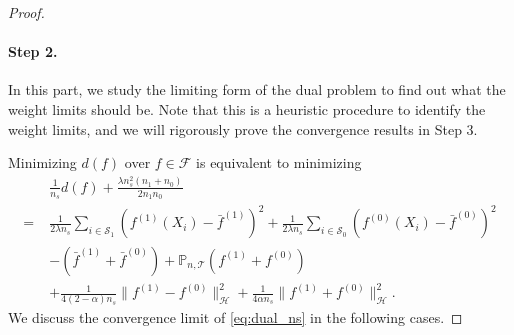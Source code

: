 \documentclass[12pt]{article}
\newcommand{\prob}{\mathbb{P}}
\begin{document}
\begin{proof}
	
	\paragraph{Step 2.}
	In this part, we study the limiting form of the dual problem to find out what the weight limits should be. Note that this is a heuristic procedure to identify the weight limits, and we will rigorously prove the convergence results in Step 3.
	
	Minimizing $d(f)$ over $f \in \mathcal{F}$ is equivalent to minimizing
	\begin{equation}
		\label{eq:dual_ns}
		\begin{aligned}
			& \frac{1}{n_s} d(f) + \frac{\lambda n_s^2 (n_1 + n_0)}{2 n_1 n_0}
			\\=\;&
			\frac{1}{2\lambda n_s} \sum_{i \in \mathcal{S}_1} (f^{(1)}(X_i) - \bar{f}^{(1)})^2 +
			\frac{1}{2\lambda n_s} \sum_{i \in \mathcal{S}_0} (f^{(0)}(X_i) - \bar{f}^{(0)})^2 
			\\&-
			(\bar{f}^{(1)} + \bar{f}^{(0)}) +
			\prob_{n, \mathcal{T}}(f^{(1)} + f^{(0)})
			\\&+
			\frac{1}{4(2-\alpha)n_s} \| f^{(1)} - f^{(0)} \|_\mathcal{H}^2 +
			\frac{1}{4\alpha n_s} \| f^{(1)} + f^{(0)} \|_\mathcal{H}^2
			.\end{aligned}
	\end{equation}
	We discuss the convergence limit of \eqref{eq:dual_ns} in the following cases.
	

\end{proof}
\end{document}

